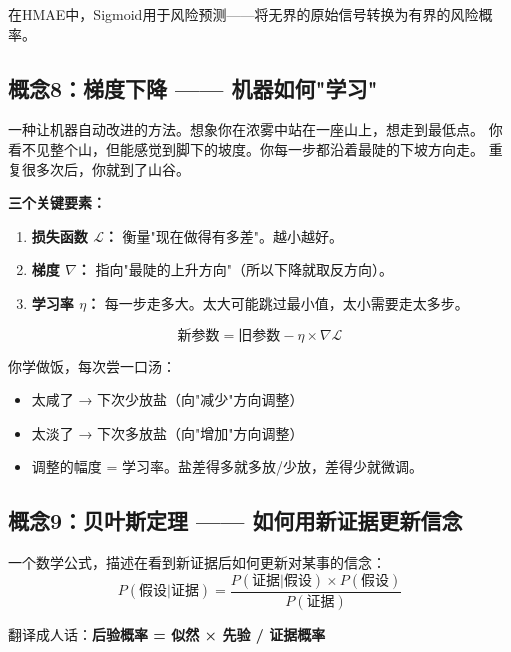 \documentclass[11pt,a4paper]{ctexart}
\begin{document}
在HMAE中，Sigmoid用于风险预测——将无界的原始信号转换为有界的风险概率。

\subsection{概念8：梯度下降 —— 机器如何"学习"}

\begin{defbox}
一种让机器自动改进的方法。想象你在浓雾中站在一座山上，想走到最低点。
你看不见整个山，但能感觉到脚下的坡度。你每一步都沿着最陡的下坡方向走。
重复很多次后，你就到了山谷。
\end{defbox}

\textbf{三个关键要素：}
\begin{enumerate}[nosep]
\item \textbf{损失函数 $\mathcal{L}$：} 衡量"现在做得有多差"。越小越好。
\item \textbf{梯度 $\nabla$：} 指向"最陡的上升方向"（所以下降就取反方向）。
\item \textbf{学习率 $\eta$：} 每一步走多大。太大可能跳过最小值，太小需要走太多步。
\end{enumerate}

$$\text{新参数} = \text{旧参数} - \eta \times \nabla\mathcal{L}$$

\begin{exambox}
你学做饭，每次尝一口汤：
\begin{itemize}[nosep]
\item 太咸了 → 下次少放盐（向"减少"方向调整）
\item 太淡了 → 下次多放盐（向"增加"方向调整）
\item 调整的幅度 = 学习率。盐差得多就多放/少放，差得少就微调。
\end{itemize}
\end{exambox}

\subsection{概念9：贝叶斯定理 —— 如何用新证据更新信念}

\begin{defbox}
一个数学公式，描述在看到新证据后如何更新对某事的信念：
$$P(\text{假设}|\text{证据}) = \frac{P(\text{证据}|\text{假设}) \times P(\text{假设})}{P(\text{证据})}$$

翻译成人话：\textbf{后验概率 = 似然 × 先验 / 证据概率}
\end{defbox}
\end{document}
